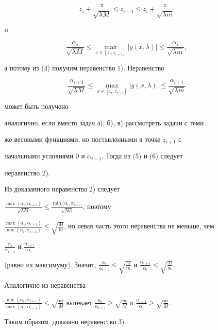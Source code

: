 \begin{pf}
\begin{equation}
z_i+\frac{\pi}{\sqrt{\lambda M}}\le z_{i+1}\le z_i+ 


\frac{\pi}{\sqrt{\lambda m}} 


\end{equation} 


и 


\begin{equation} 


\frac{\alpha_i}{\sqrt{\lambda M}}\le\max_{x\in[z_i,z_{i+1}]} 


|y(x,\lambda)|\le\frac{\alpha_i}{\sqrt{\lambda m}}, 


\end{equation} 


а потому из (4) получим неравенство 1). Неравенство 


\begin{equation} 


\frac{\alpha_{i+1}}{\sqrt{\lambda M}}\le 


\max_{x\in[z_i,z_{i+1}]}|y(x,\lambda)|\le 


\frac{\alpha_{i+1}}{\sqrt{\lambda m}} 


\end{equation} 


может быть получено 


аналогично, если вместо задач а), б), в) рассмотреть задачи с теми 


же весовыми функциями, но поставленными в точке $z_{i+1}$ с 


начальными условиями 0 и $\alpha_{i+1}$. Тогда из (5) и (6) следует 


неравенство 2). 


 


Из доказанного неравенства 2) следует 


$\frac{\max(\alpha_i,\alpha_{i+1})}{\sqrt{\lambda M}}\le 


\frac{\min(\alpha_i,\alpha_{i+1)}}{\sqrt{\lambda m}}$, поэтому 


$\frac{\max(\alpha_i,\alpha_{i+1})}{\min(\alpha_i,\alpha_{i+1})}\le 


\sqrt{\frac{M}{m}}$, но левая часть этого неравенства не меньше, чем 


$\frac{\alpha_i}{\alpha_{i+1}}$ и $\frac{\alpha_{i+1}}{\alpha_i}$ 


(равно их максимуму). Значит, $\frac{\alpha_i}{\alpha_{i+1}}\le 


\sqrt{\frac{M}{m}}$ и $\frac{\alpha_{i+1}}{\alpha_i}\le 


\sqrt{\frac{M}{m}}$. 


Аналогично из неравенства 


$\frac{\min(\alpha_i,\alpha_{i+1})}{\max(\alpha_i,\alpha_{i+1})}\le 


\sqrt{\frac{m}{M}}$ вытекает $\frac{\alpha_i}{\alpha_{i+1}}\ge 


\sqrt{\frac{m}{M}}$ и $\frac{\alpha_{i+1}}{\alpha_i}\ge 


\sqrt{\frac{m}{M}}$. 


Таким образом, доказано неравенство 3). 


\end{pf} 


